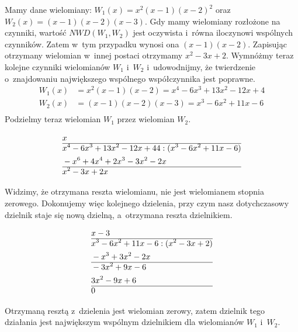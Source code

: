 \begin{example}
	$ $\\
	Mamy dane wielomiany: $W_1(x) = x^2(x-1)(x-2)^2$ oraz $W_2(x) = (x-1)(x-2)(x-3)$. Gdy mamy wielomiany rozłożone na czynniki, wartość $NWD(W_1, W_2)$ jest oczywista i~równa iloczynowi wspólnych czynników. Zatem w~tym przypadku wynosi ona $(x-1)(x-2)$. Zapisując otrzymany wielomian w~innej postaci otrzymamy $x^2-3x+2$. Wymnóżmy teraz kolejne czynniki wielomianów $W_1$ i~$W_2$ i~udowodnijmy, że twierdzenie o~znajdowaniu największego wspólnego współczynnika jest poprawne.
	\begin{equation*}
		\begin{split}
			W_1(x) &= x^2(x-1)(x-2) = x^4-6x^3+13x^2-12x+4 \\
			W_2(x) &= (x-1)(x-2)(x-3) = x^3-6x^2+11x-6 \\
		\end{split}
	\end{equation*}
	Podzielmy teraz wielomian $W_1$ przez wielomian $W_2$.
	
	\begin{equation*}
	\begin{split}
	&x\\\hline
	&x^4-6x^3+13x^2-12x+44 : (x^3-6x^2+11x-6) \\
	&-x^6+4x^4+2x^3-3x^2-2x \\\hline
	&x^2-3x+2x
	\end{split}
	\end{equation*}
	
	Widzimy, że otrzymana reszta wielomianu, nie jest wielomianem stopnia zerowego. Dokonujemy więc kolejnego dzielenia, przy czym nasz dotychczasowy dzielnik staje się nową dzielną, a~otrzymana reszta dzielnikiem.
	
	\begin{equation*}
	\begin{split}
	&x-3\\\hline
	&x^3-6x^2+11x-6 : (x^2-3x+2) \\
	&-x^3+3x^2-2x \\\hline
	&-3x^2+9x-6 \\
	&3x^2-9x+6  \\\hline
	&0
	\end{split}
	\end{equation*}
	
	Otrzymaną resztą z~dzielenia jest wielomian zerowy, zatem dzielnik tego działania jest największym wspólnym dzielnikiem dla wielomianów $W_1$ i~$W_2$.
\end{example}

